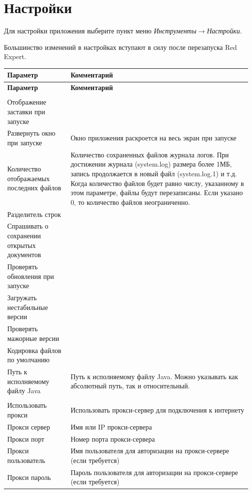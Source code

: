 \section{Настройки}
Для настройки приложения выберите пункт меню \textit{Инструменты}$\rightarrow$\textit{Настройки}.
\begin{redremark}
	Большинство изменений в настройках вступают в силу после перезапуска Red Expert.
\end{redremark}
\begin{longtable}[r]{|>{\ttfamily}m{6cm}|m{9cm}|}
	\hline
	\centering\normalfont\bfseries Параметр &
	\centering\arraybslash\bfseries Комментарий\\\hline
	\endfirsthead
	\hline
	\centering\normalfont\bfseries Параметр &
	\centering\arraybslash\bfseries Комментарий\\\hline
	\endhead
	\rowcolor[gray]{.9}\multicolumn{2}{|m{15.25cm}|}{\bfseries Общие}\\\hline 
	Отображение заставки при запуске
	&  \\\hline
	Развернуть окно при запуске 
	& Окно приложения раскроется на весь экран при запуске\\\hline
	Количество отображаемых последних файлов
	& Количество сохраненных файлов журнала логов. При достижении журнала (system.log) размера более 1МБ, запись продолжается в новый файл (system.log.1) и т.д. Когда количество файлов будет равно числу, указанному в этом параметре, файлы будут перезаписаны. Если указано 0, то количество файлов неограниченно. \\\hline
	Разделитель строк
	&  \\\hline
	Спрашивать о сохранении открытых документов
	&  \\\hline
	Проверять обновления при запуске
	& \\\hline
	Загружать нестабильные версии
	&  \\\hline 
	Проверять мажорные версии
	&  \\\hline
	Кодировка файлов по умолчанию
	&   \\\hline
	Путь к исполняемому файлу Java
	& Путь к исполняемому файлу Java. Можно указывать как абсолютный путь, так и относительный. \\\hline
	\rowcolor[gray]{.9}\multicolumn{2}{|m{15.25cm}|}{\bfseries Настройка прокси}\\\hline 
	Использовать прокси 
	&  Использовать прокси-сервер для подключения к интернету \\\hline
	Прокси сервер
	&  Имя или IP прокси-сервера \\\hline
	Прокси порт
	& Номер порта прокси-сервера \\\hline 
	Прокси пользователь
	&  Имя пользователя для авторизации на прокси-сервере (если требуется)\\\hline
	Прокси пароль
	& Пароль пользователя для авторизации на прокси-сервере (если требуется)\\\hline  
\end{longtable} 

